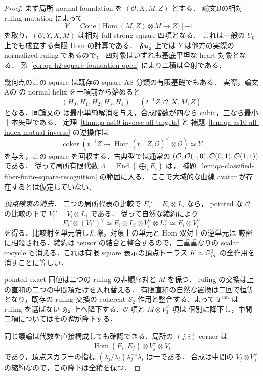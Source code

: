 \begin{proof}
まず局所 normal foundation を $(\mathcal O,X,M,Z)$ とする．
論文Bの相対 ruling mutation によって
\[
 Y=\operatorname{Cone}
 \bigl(\operatorname{Hom}(M,Z)\otimes M\to Z\bigr)[-1]
\]
を取り，$(\mathcal O,Y,X,M)$ は相対 full strong square 四項となる．
これは一般の $U_0$ 上でも成立する有限 Hom の計算である．
$\mathfrak F_{\mathcal H_2}$ 上では $Y$ は他方の実際の normalized ruling であるので，
四対象はいずれも基底平坦な heart 対象となる．
系~\ref{cor:qa-h2-square-foundation-open} により二積は全射である．

幾何点のこの square は既存の square AS 分類の有限基礎でもある．
実際，論文Aの \cite[\texttt{thm:normal-helix}]{QuadricIntrinsic2026}
の normal helix を一項前から始めると
\[
 (H_0,H_1,H_2,H_3,H_4)=(t^{-1}Z,\mathcal O,X,M,Z)
\]
となる．同論文の \cite[\texttt{cor:normal-cubic-defect}]{QuadricIntrinsic2026}
は最小単純解消を与え，合成階数が四なら cubic，三なら最小十本矢型である．
定理~\ref{thm:qa-as10-inverse-all-targets} と
補題~\ref{lem:qa-as10-all-index-mutual-inverse} の逆操作は
\[
 \operatorname{coker}
 (t^{-1}Z\to\operatorname{Hom}(t^{-1}Z,\mathcal O)^\vee\otimes\mathcal O)
   \simeq Y
\]
を与え，この square を回収する．古典型では通常の
$(\mathcal O,\mathcal O(1,0),\mathcal O(0,1),\mathcal O(1,1))$ である．
従って局所有限代数 $\Lambda=\operatorname{End}(\bigoplus_iE_i)$ は，
補題~\ref{lem:qa-classified-fiber-finite-square-recognition} の範囲に入る．
ここで大域的な曲線 avatar が存在するとは仮定していない．

\emph{頂点線束の消去．}
二つの局所代表の比較で $E_i'=E_i\otimes L_i$ なら，
pointed な $\mathcal O$ の比較の下で $V_i'=V_i\otimes L_i$ である．
従って自然な縮約により
\[
 E_i'\otimes(V_i')^\vee
 \simeq E_i\otimes L_i\otimes V_i^\vee\otimes L_i^\vee
 \simeq E_i\otimes V_i^\vee
\]
を得る．比較射を単元倍した際，対象上の単元と Hom 双対上の逆単元は
厳密に相殺される．縮約は tensor の結合と整合するので，三重重なりの
scalar cocycle も消える．これは有限 square 表示の頂点トーラス
$K\simeq\mathbb G_m^3$ の全作用を消すことに等しい．

pointed exact 同値は二つの ruling の非順序対と $M$ を保つ．
ruling の交換は上の直和の二つの中間項だけを入れ替える．
有限直和の自然な置換は二回で恒等となり，既存の ruling 交換の coherent
$S_2$ 作用と整合する．よって $T^{\mathrm{can}}$ は ruling を選ばない
$\mathfrak H_2$ 上へ降下する．$\mathcal O$ 項と $M\otimes V_3^\vee$ 項は
個別に降下し，中間二項についてはその\emph{和}が降下する．

同じ議論は代数を直接構成しても確認できる．局所の $(j,i)$ corner は
\[
 \operatorname{Hom}(E_i,E_j)\otimes V_j^\vee\otimes V_i
\]
であり，頂点スカラーの指標
$(\lambda_j/\lambda_i)\lambda_j^{-1}\lambda_i$ は一である．
合成は中間の $V_j\otimes V_j^\vee$ の縮約なので，この降下は全積を保つ．


\end{proof}

